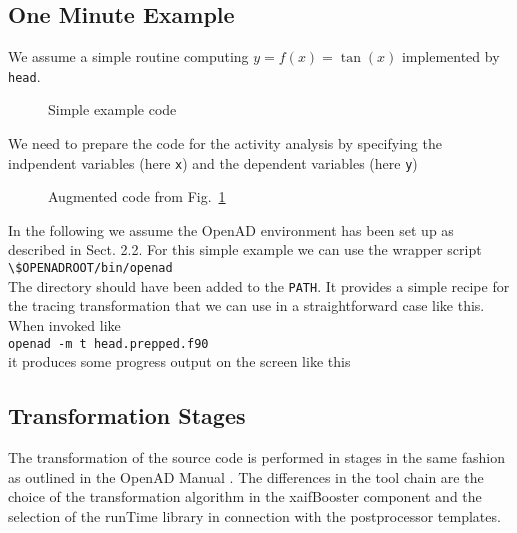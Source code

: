 \documentclass{article}
\newcommand{\reffig}[1]{{Fig.~\ref{#1}}}
\begin{document}
\subsection{One Minute Example}
We assume a simple routine computing $y=f(x)=\tan(x)$ implemented by \lstinline{head}.
\begin{figure}

\caption{Simple example code}\label{fig:oneMinute}
\end{figure}
We need to prepare the code for the activity analysis by specifying the indpendent variables
(here \lstinline{x}) and the dependent variables (here \lstinline{y})
\begin{figure}

\caption{Augmented code from \reffig{fig:oneMinute}}\label{fig:oneMinutePrepped}
\end{figure}
In the following we assume the OpenAD environment has been set up as 
described in \cite{manual} Sect. 2.2.
For this simple example we can use the  wrapper script\\
\hspace{1cm}\lstinline{\$OPENADROOT/bin/openad}\\
The directory should have been added to the \lstinline{PATH}. 
It provides a simple recipe for the tracing transformation that we can use in 
a straightforward case like this. When invoked like\\  
\hspace{1cm}\lstinline{openad -m t head.prepped.f90}\\
it produces some progress output on the screen like this
{\tiny
{}
}








\subsection{Transformation Stages}
The transformation of the source code is performed in stages in the same fashion as 
outlined in the OpenAD Manual \cite{openadManual}. 
The differences in the tool chain are the choice of the transformation algorithm 
in the xaifBooster component and the selection of the runTime library in connection with 
the postprocessor templates. 
\end{document}
